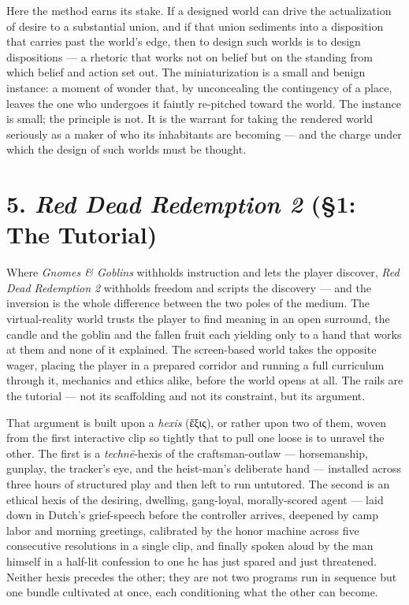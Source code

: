 \documentclass{article}
\newcommand{\gk}[1]{{\greekfont #1}}
\begin{document}
Here the method earns its stake. If a designed world can drive the actualization of desire to a substantial union, and if that union sediments into a disposition that carries past the world's edge, then to design such worlds is to design dispositions — a rhetoric that works not on belief but on the standing from which belief and action set out. The miniaturization is a small and benign instance: a moment of wonder that, by unconcealing the contingency of a place, leaves the one who undergoes it faintly re-pitched toward the world. The instance is small; the principle is not. It is the warrant for taking the rendered world seriously as a maker of who its inhabitants are becoming — and the charge under which the design of such worlds must be thought.

\bigskip

\section*{5. \textit{Red Dead Redemption 2} (§1: The Tutorial)}

Where \textit{Gnomes \& Goblins} withholds instruction and lets the player discover, \textit{Red Dead Redemption 2} withholds freedom and scripts the discovery — and the inversion is the whole difference between the two poles of the medium. The virtual-reality world trusts the player to find meaning in an open surround, the candle and the goblin and the fallen fruit each yielding only to a hand that works at them and none of it explained. The screen-based world takes the opposite wager, placing the player in a prepared corridor and running a full curriculum through it, mechanics and ethics alike, before the world opens at all. The rails are the tutorial — not its scaffolding and not its constraint, but its argument.

That argument is built upon a \textit{hexis} (\gk{ἕξις}), or rather upon two of them, woven from the first interactive clip so tightly that to pull one loose is to unravel the other. The first is a \textit{technē}-hexis of the craftsman-outlaw — horsemanship, gunplay, the tracker's eye, and the heist-man's deliberate hand — installed across three hours of structured play and then left to run untutored. The second is an ethical hexis of the desiring, dwelling, gang-loyal, morally-scored agent — laid down in Dutch's grief-speech before the controller arrives, deepened by camp labor and morning greetings, calibrated by the honor machine across five consecutive resolutions in a single clip, and finally spoken aloud by the man himself in a half-lit confession to one he has just spared and just threatened. Neither hexis precedes the other; they are not two programs run in sequence but one bundle cultivated at once, each conditioning what the other can become.
\end{document}
